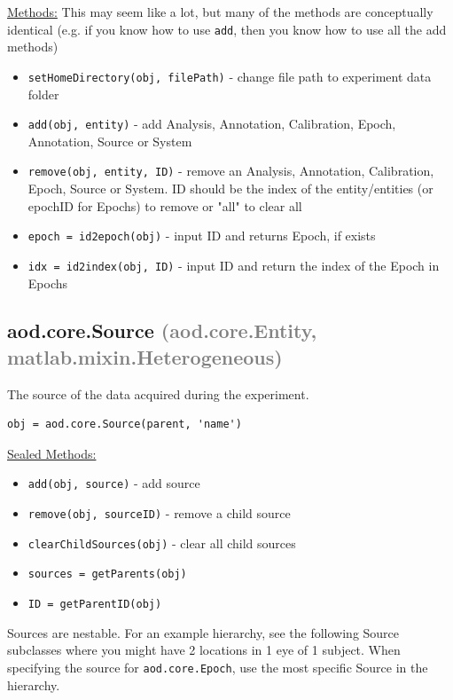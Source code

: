 \documentclass[10pt]{exam}
\newcommand\myparent[1]{\textcolor{gray}{(#1)}}
\newcommand\aodclass[1]{\textcolor{codeblue}{\texttt{#1}}}
\newcommand\aodfcn[1]{\textcolor{darkteal}{\texttt{#1}}}
\newcommand\docheader[1]{\vspace{0.6ex}\noindent\underline{#1}\vspace{0.15ex}}
\begin{document}
		\docheader{Methods:} This may seem like a lot, but many of the methods are conceptually identical (e.g. if you know how to use \aodfcn{add}, then you know how to use all the add methods)
		\begin{itemize}
			\item \aodfcn{setHomeDirectory(obj, filePath)} - change file path to experiment data folder
			\item \aodfcn{add(obj, entity)} - add Analysis, Annotation, Calibration, Epoch, Annotation, Source or System
			\item \aodfcn{remove(obj, entity, ID)} - remove an Analysis, Annotation, Calibration, Epoch, Source or System. ID should be the index of the entity/entities (or epochID for Epochs) to remove or "all" to clear all \\
			\item \aodfcn{epoch = id2epoch(obj)} - input ID and returns Epoch, if exists
			\item \aodfcn{idx = id2index(obj, ID)} - input ID and return the index of the Epoch in Epochs \\
		\end{itemize}
	\subsection{aod.core.Source \myparent{aod.core.Entity, matlab.mixin.Heterogeneous}}
		\label{subsection:aod.core.Source}
		\noindent The source of the data acquired during the experiment. 
		\begin{lstlisting}[style=matlab-editor, basicstyle=\mlttfamily\footnotesize]
obj = aod.core.Source(parent, 'name')
		\end{lstlisting}
		\docheader{Sealed Methods:}
		\begin{itemize}
			\item \aodfcn{add(obj, source)} - add source 
			\item \aodfcn{remove(obj, sourceID)} - remove a child source
			\item \aodfcn{clearChildSources(obj)} - clear all child sources
			\item \aodfcn{sources = getParents(obj)}
			\item \aodfcn{ID = getParentID(obj)}
		\end{itemize}

		\noindent Sources are nestable. For an example hierarchy, see the following Source subclasses where you might have 2 locations in 1 eye of 1 subject. 
		When specifying the source for \aodclass{aod.core.Epoch}, use the most specific Source in the hierarchy.
\end{document}
